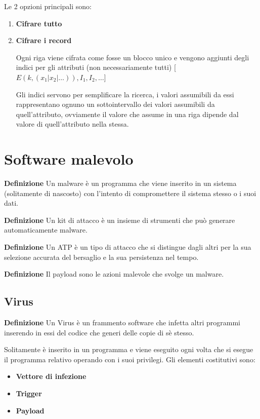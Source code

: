 \documentclass{article}
\newcommand{\df}[1]{\noindent\textbf{Definizione } #1.\newline}
\begin{document}
\noindent Le 2 opzioni principali sono:
\begin{enumerate}
    \item \textbf{Cifrare tutto}
    \item \textbf{Cifrare i record}

        Ogni riga viene cifrata come fosse un blocco unico e vengono aggiunti degli indici per gli attributi (non necessariamente tutti) [$E(k,(x_1|x_2|\ldots)),I_1,I_2,\ldots$]

        \vspace{3pt}
        
        Gli indici servono per semplificare la ricerca, i valori assumibili da essi rappresentano ognuno un sottointervallo dei valori assumibili da quell'attributo, ovviamente il valore che assume in una riga dipende dal valore di quell'attributo nella stessa.
    
\end{enumerate}

\section{Software malevolo}

\df{Un malware è un programma che viene inserito in un sistema (solitamente di nascosto) con l'intento di compromettere il sistema stesso o i suoi dati}

\df{Un kit di attacco è un insieme di strumenti che può generare automaticamente malware}

\df{Un ATP è un tipo di attacco che si distingue dagli altri per la sua selezione accurata del bersaglio e la sua persistenza nel tempo}

\df{Il payload sono le azioni malevole che svolge un malware}

\subsection{Virus}

\df{Un Virus è un frammento software che infetta altri programmi inserendo in essi del codice che generi delle copie di sè stesso}

\noindent Solitamente è inserito in un programma e viene eseguito ogni volta che si esegue il programma relativo operando con i suoi privilegi. Gli elementi costitutivi sono:
\begin{itemize}
    \item \textbf{Vettore di infezione}
    \item \textbf{Trigger}
    \item \textbf{Payload}\newline
\end{itemize}
\end{document}
